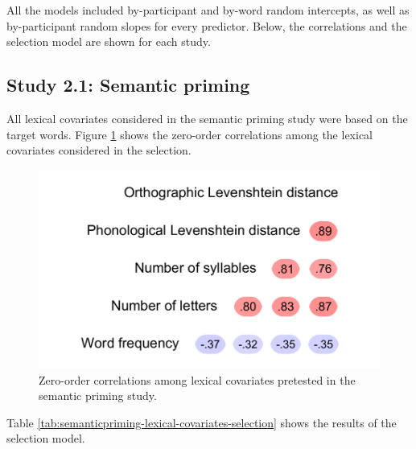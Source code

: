 \documentclass[
  12pt,
  man,floatsintext]{apa7}
\begin{document}
All the models included by-participant and by-word random intercepts, as well as by-participant random slopes for every predictor. Below, the correlations and the selection model are shown for each study.

\hypertarget{study-2.1-semantic-priming-1}{%
\subsection{Study 2.1: Semantic priming}\label{study-2.1-semantic-priming-1}}

All lexical covariates considered in the semantic priming study were based on the target words. Figure \ref{fig:semanticpriming-lexical-covariates-correlations} shows the zero-order correlations among the lexical covariates considered in the selection.

\begin{figure}

{\centering \includegraphics[width=0.5\linewidth]{thesis-core_files/figure-latex/semanticpriming-lexical-covariates-correlations-1} 

}

\caption{Zero-order correlations among lexical covariates pretested in the semantic priming study.}\label{fig:semanticpriming-lexical-covariates-correlations}
\end{figure}

Table \ref{tab:semanticpriming-lexical-covariates-selection} shows the results of the selection model.
\end{document}
